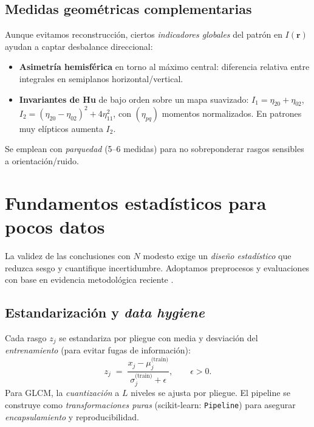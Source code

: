 \subsection{Medidas geométricas complementarias}
\label{subsec:shape}

Aunque evitamos reconstrucción, ciertos \emph{indicadores globales} del patrón en $I(\mathbf{r})$ ayudan a captar desbalance direccional:
\begin{itemize}
\item \textbf{Asimetría hemisférica} en torno al máximo central: diferencia relativa entre integrales en semiplanos horizontal/vertical.
\item \textbf{Invariantes de Hu} de bajo orden sobre un mapa suavizado: $I_1=\eta_{20}+\eta_{02}$, $I_2=(\eta_{20}-\eta_{02})^2+4\eta_{11}^2$, con $(\eta_{pq})$ momentos normalizados. En patrones muy elípticos aumenta $I_2$.
\end{itemize}
Se emplean con \emph{parquedad} (5--6 medidas) para no sobreponderar rasgos sensibles a orientación/ruido.

\section{Fundamentos estadísticos para pocos datos}
\label{sec:estadistica}

La validez de las conclusiones con $N$ modesto exige un \emph{diseño estadístico} que reduzca sesgo y cuantifique incertidumbre. Adoptamos preprocesos y evaluaciones con base en evidencia metodológica reciente \cite{Tsamardinos2022Patterns}.

\subsection{Estandarización y \emph{data hygiene}}
\label{subsec:scaling}

Cada rasgo $z_j$ se estandariza por pliegue con media y desviación del \emph{entrenamiento} (para evitar fugas de información):
\begin{equation}
z_j \;=\; \frac{x_j - \mu_j^\text{(train)}}{\sigma_j^\text{(train)}+\epsilon},\qquad \epsilon>0.
\end{equation}
Para GLCM, la \emph{cuantización} a $L$ niveles se ajusta por pliegue. El pipeline se construye como \emph{transformaciones puras} (scikit-learn: \texttt{Pipeline}) para asegurar \emph{encapsulamiento} y reproducibilidad.


